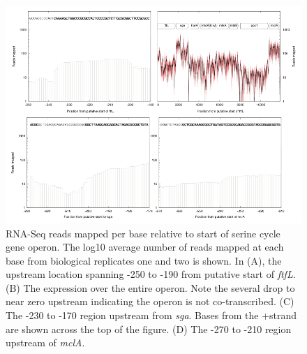 \begin{figure}[H]
\centering
     \includegraphics[width=1.0\textwidth]{./tex/chapter1/figures/supplemental/FigureS4.png}
     \begin{singlespace}
     \caption[RNA-Seq reads mapped per base relative to start of serine cycle gene operon]{
        RNA-Seq reads mapped per base relative to start of serine cycle gene operon.
        The log10 average number of reads mapped at each base from biological replicates one and two is shown.
        In (A), the upstream location spanning -250 to -190 from putative start of \textit{ftfL}.
        (B) The expression over the entire operon.
        Note the several drop to near zero upstream indicating the operon is not co-transcribed.
        (C) The -230 to -170 region upstream from \textit{sga}.
        Bases from the +strand are shown across the top of the figure.
        (D) The -270 to -210 region upstream of \textit{mclA}.
        }
     \label{fig:S4} %
     \end{singlespace}
\end{figure}


